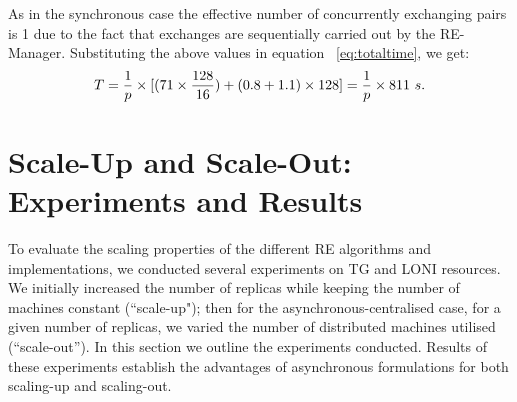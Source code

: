 \documentclass{rspublic}
\newcommand{\alnote}[1]{ {\textcolor{blue} { ***andre: #1 }}}
\newcommand{\athotanote}[1]{ {\textcolor{green} { ***athota: #1 }}}
\newcommand{\alnote}[1]{}
\newcommand{\athotanote}[1]{}
\begin{document}



As in the synchronous case the effective number of concurrently
exchanging pairs is 1 due to the fact that exchanges are sequentially
carried out by the RE-Manager.  Substituting the above values in
equation ~\ref{eq:totaltime}, we get:
\begin{eqnarray}
T=  {1 \over p} \times {[ {(71\times {128\over 16}}) + (0.8 + 1.1)\times 128]} = {1 \over p} \times 811~s.
\label{eq:cent}
\end{eqnarray}

\section{Scale-Up and Scale-Out: Experiments and
  Results}\label{sec:performance}

To evaluate the scaling properties of the different RE algorithms and
implementations, we conducted several experiments on TG and LONI
resources. We initially increased the number of replicas while keeping
the number of machines constant (``scale-up"); then for the
asynchronous-centralised case, for a given number of replicas, we
varied the number of distributed machines utilised (``scale-out''). In
this section we outline the experiments conducted. Results of these
experiments establish the advantages of asynchronous formulations for
both scaling-up and scaling-out.

\end{document}
